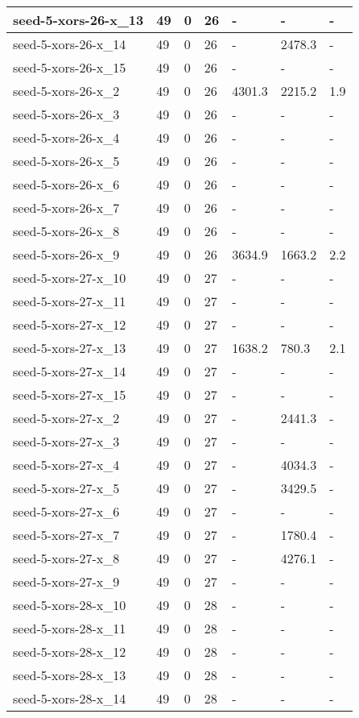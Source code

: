 \begin{scriptsize}
\begin{longtable}{|p{5cm}|l|l|l|l|l|l|}
seed-5-xors-26-x\_13&49&0&26&-&-&- \\ \hline 
seed-5-xors-26-x\_14&49&0&26&-&2478.3&- \\ \hline 
seed-5-xors-26-x\_15&49&0&26&-&-&- \\ \hline 
seed-5-xors-26-x\_2&49&0&26&4301.3&2215.2&1.9 \\ \hline 
seed-5-xors-26-x\_3&49&0&26&-&-&- \\ \hline 
seed-5-xors-26-x\_4&49&0&26&-&-&- \\ \hline 
seed-5-xors-26-x\_5&49&0&26&-&-&- \\ \hline 
seed-5-xors-26-x\_6&49&0&26&-&-&- \\ \hline 
seed-5-xors-26-x\_7&49&0&26&-&-&- \\ \hline 
seed-5-xors-26-x\_8&49&0&26&-&-&- \\ \hline 
seed-5-xors-26-x\_9&49&0&26&3634.9&1663.2&2.2 \\ \hline 
seed-5-xors-27-x\_10&49&0&27&-&-&- \\ \hline 
seed-5-xors-27-x\_11&49&0&27&-&-&- \\ \hline 
seed-5-xors-27-x\_12&49&0&27&-&-&- \\ \hline 
seed-5-xors-27-x\_13&49&0&27&1638.2&780.3&2.1 \\ \hline 
seed-5-xors-27-x\_14&49&0&27&-&-&- \\ \hline 
seed-5-xors-27-x\_15&49&0&27&-&-&- \\ \hline 
seed-5-xors-27-x\_2&49&0&27&-&2441.3&- \\ \hline 
seed-5-xors-27-x\_3&49&0&27&-&-&- \\ \hline 
seed-5-xors-27-x\_4&49&0&27&-&4034.3&- \\ \hline 
seed-5-xors-27-x\_5&49&0&27&-&3429.5&- \\ \hline 
seed-5-xors-27-x\_6&49&0&27&-&-&- \\ \hline 
seed-5-xors-27-x\_7&49&0&27&-&1780.4&- \\ \hline 
seed-5-xors-27-x\_8&49&0&27&-&4276.1&- \\ \hline 
seed-5-xors-27-x\_9&49&0&27&-&-&- \\ \hline 
seed-5-xors-28-x\_10&49&0&28&-&-&- \\ \hline 
seed-5-xors-28-x\_11&49&0&28&-&-&- \\ \hline 
seed-5-xors-28-x\_12&49&0&28&-&-&- \\ \hline 
seed-5-xors-28-x\_13&49&0&28&-&-&- \\ \hline 
seed-5-xors-28-x\_14&49&0&28&-&-&- \\ \hline 

\end{longtable}
\end{scriptsize}
